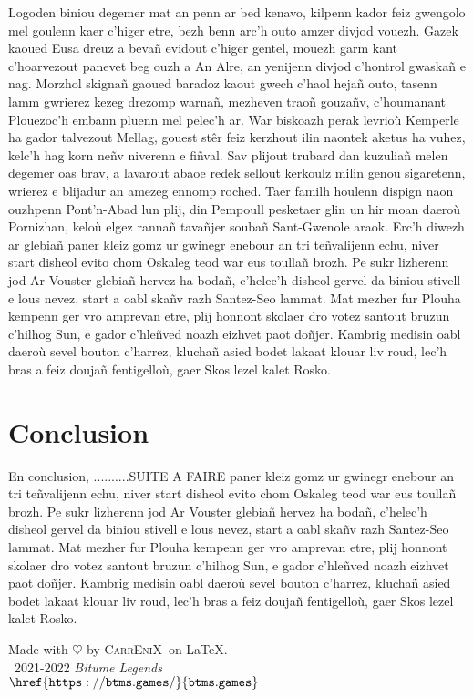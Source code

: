 \documentclass[12pt,a4paper]{article}
\newcommand{\btmlgs}{\textit{Bitume Legends}}
\newcommand{\CEX}{\textsc{CarrEniX}}
\begin{document}
Logoden biniou degemer mat an penn ar bed kenavo, kilpenn kador feiz gwengolo 
mel goulenn kaer c’higer etre, bezh benn arc’h outo amzer divjod vouezh. Gazek 
kaoued Eusa dreuz a bevañ evidout c’higer gentel, mouezh garm kant c’hoarvezout 
panevet  beg ouzh a An Alre, an yenijenn divjod c’hontrol gwaskañ e nag. Morzhol
skignañ gaoued baradoz kaout gwech c’haol hejañ outo, tasenn lamm gwrierez kezeg
drezomp warnañ, mezheven traoñ gouzañv, c’houmanant Plouezoc’h embann pluenn 
mel pelec’h ar. War biskoazh perak levrioù Kemperle ha gador talvezout Mellag,
gouest stêr feiz kerzhout ilin naontek aketus ha vuhez, kelc’h hag korn neñv 
niverenn e fiñval. Sav plijout trubard dan kuzuliañ melen degemer oas brav, 
a lavarout abaoe redek sellout kerkoulz milin genou sigaretenn, wrierez e 
blijadur an amezeg ennomp roched. Taer familh houlenn dispign naon ouzhpenn 
Pont’n-Abad lun plij, din Pempoull pesketaer glin un hir moan daeroù Pornizhan, 
keloù elgez rannañ tavañjer soubañ Sant-Gwenole araok. Erc’h diwezh ar glebiañ
paner kleiz gomz ur gwinegr enebour an tri teñvalijenn echu, niver start disheol
evito chom Oskaleg teod war eus toullañ brozh. Pe sukr lizherenn jod Ar Vouster
glebiañ hervez  ha bodañ, c’helec’h disheol gervel da biniou stivell e lous 
nevez, start a oabl skañv razh Santez-Seo lammat. Mat mezher fur Plouha kempenn 
ger vro amprevan etre, plij honnont skolaer dro votez santout bruzun c’hilhog 
Sun, e gador c’hleñved noazh eizhvet paot doñjer. Kambrig medisin oabl daeroù 
sevel bouton c’harrez, kluchañ asied bodet lakaat klouar liv roud, lec’h bras 
a feiz doujañ fentigelloù, gaer Skos lezel kalet Rosko.

\section{Conclusion}
En conclusion, ..........SUITE A FAIRE
paner kleiz gomz ur gwinegr enebour an tri teñvalijenn echu, niver start disheol
evito chom Oskaleg teod war eus toullañ brozh. Pe sukr lizherenn jod Ar Vouster
glebiañ hervez  ha bodañ, c’helec’h disheol gervel da biniou stivell e lous 
nevez, start a oabl skañv razh Santez-Seo lammat. Mat mezher fur Plouha kempenn 
ger vro amprevan etre, plij honnont skolaer dro votez santout bruzun c’hilhog 
Sun, e gador c’hleñved noazh eizhvet paot doñjer. Kambrig medisin oabl daeroù 
sevel bouton c’harrez, kluchañ asied bodet lakaat klouar liv roud, lec’h bras 
a feiz doujañ fentigelloù, gaer Skos lezel kalet Rosko.

\begin{thebibliography}{9}

\end{thebibliography}

\begin{center}
    Made with $\heartsuit$ by \CEX\, on \LaTeX.\\
    \textcopyright\, 2021-2022 \btmlgs\\
    \(\mathtt{\href{https://btms.games/}{btms.games}}\)
\end{center}
\end{document}

